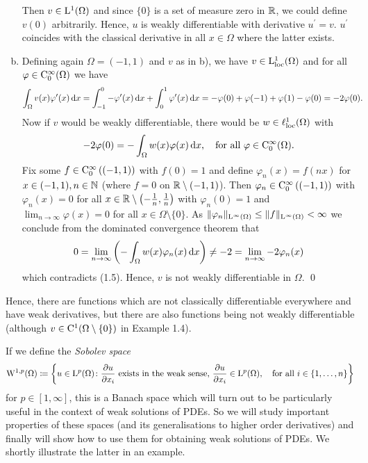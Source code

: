 \begin{ex}
\begin{enumerate}[a)]
      Then $v \in \mathrm{L}^1(\Omega)$ and since $\{0\}$ is a set of measure zero in $\mathbb{R}$, we could define $v(0)$ arbitrarily.
      Hence, $u$ is weakly differentiable with derivative $u^\prime = v$.
      $u^\prime$ coincides with the classical derivative in all $x \in \Omega$ where the latter exists.
    \item Defining again $\Omega = (-1,1)$ and $v$ as in b), we have $v \in \mathrm{L}_{\operatorname{loc}}^1(\Omega)$ and for all $\varphi \in \mathrm{C}_0^\infty(\Omega)$ we have
      \begin{align*}
      \int_\Omega v(x) \varphi^\prime(x) \, {\operatorname{d}\!{x}} 
      &= \int_{-1}^0 - \varphi^\prime(x) \, {\operatorname{d}\!{x}} + \int_0^1 \varphi^\prime(x) \, {\operatorname{d}\!{x}} 
      = - \varphi(0) + \varphi(-1) + \varphi(1) - \varphi(0) = -2\varphi(0).
      \end{align*}
      Now if $v$ would be weakly differentiable, there would be $w \in \ell_{\operatorname{loc}}^1(\Omega)$ with
      \begin{equation}
        -2\varphi(0) = -\int_\Omega w(x) \varphi(x) \, {\operatorname{d}\!{x}}, \quad\text{for all } \varphi \in \mathrm{C}_0^\infty(\Omega).
      \end{equation}
      Fix some $f \in \mathrm{C}_0^\infty\left((-1,1)\right)$ with $f(0) = 1$ and define $\varphi_n(x) = f(nx)$ for $x \in (-1,1), n \in \mathbb{N}$ (where $f = 0$ on $\mathbb{R} \setminus(-1,1)$).
      Then $\varphi_n \in \mathrm{C}_0^\infty\left( (-1,1)\right)$ with $\varphi_n(x) = 0$ for all $x \in \mathbb{R} \setminus\left(-\frac{1}{n}, \frac{1}{n} \right)$ with $\varphi_n(0) = 1$ and $\lim_{n \to \infty} \varphi(x) = 0$ for all $x \in \Omega \setminus \{0\}$. As $\|\varphi_n\|_{\mathrm{L}^\infty(\Omega)} \leq \|f\|_{\mathrm{L}^\infty(\Omega)} < \infty$ we conclude from the dominated convergence theorem that
      $$
      0 = \lim_{n \to \infty} \left( -\int_\Omega w(x) \varphi_n(x) \, {\operatorname{d}\!{x}} \right) \neq -2 = \lim_{n \to \infty} - 2\varphi_n(x)
      $$
      which contradicts (1.5).
      Hence, $v$ is not weakly differentiable in $\Omega$.
  \qed
  \end{enumerate}
\end{ex}

Hence, there are functions which are not classically differentiable everywhere and have weak derivatives, but there are also functions being not weakly differentiable (although $v \in  \mathrm{C}^1(\Omega\setminus\{0\})$ in Example 1.4).

If we define the \emph{Sobolev space}
$$
\mathrm{W}^{1,p}(\Omega) \coloneqq \left\{u \in \mathrm{L}^p(\Omega) \colon \frac{\partial u}{\partial x_i} \text{ exists in the weak sense, } \frac{\partial u}{\partial x_i} \in \mathrm{L}^p(\Omega), \quad \text{for all } i \in \{1,\dots,n\}\right\}
$$
for $p \in [1,\infty]$, this is a Banach space which will turn out to be particularly useful in the context of weak solutions of PDEs. 
So we will study important properties of these spaces (and its generalisations to higher order derivatives) and finally will show how to use them for obtaining weak solutions of PDEs.
We shortly illustrate the latter in an example.

